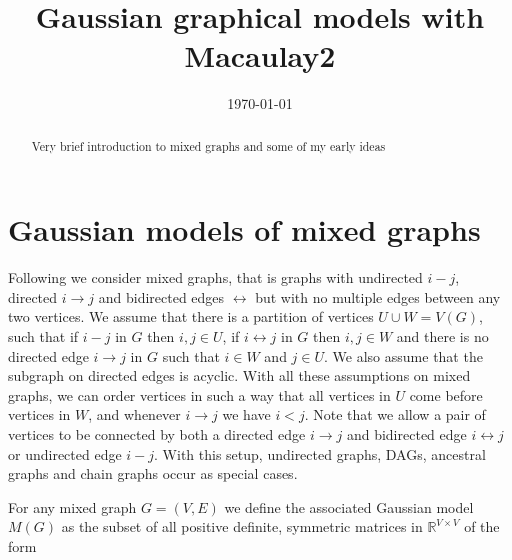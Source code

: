 \documentclass[11pt]{amsart}
\title{Gaussian graphical models with Macaulay2}
\author{}
\date{\today}                                            %
\theoremstyle{definition}
\theoremstyle{remark}
\newcommand{\R}{\mathbb{R}}
\newcommand{\lr}{\leftrightarrow}
\begin{document}
\maketitle
\begin{abstract}
Very brief introduction to mixed graphs and some of my early ideas
\end{abstract}


\section{Gaussian models of mixed graphs}

Following \cite{sullivant2008tsg} we consider mixed graphs, that is graphs with undirected $i-j$, directed $i\to j$ and bidirected edges $\lr$ but with no multiple edges between any two vertices. We assume that there is a partition of vertices $U\cup W=V(G)$, such that if $i-j$ in $G$ then $i,j\in U$, if $i\lr j$ in $G$ then $i,j\in W$ and there is no directed edge $i\to j$ in $G$ such that $i\in W$ and $j\in U$. We also assume that the subgraph on directed edges is acyclic. With all these assumptions on mixed graphs, we can order vertices in such a way that all vertices in $U$ come before vertices in $W$, and whenever $i\to j$ we have $i<j$. Note that we allow a pair of vertices to be connected by both a directed edge $i\to j$ and bidirected edge $i\lr j$ or undirected edge $i-j$. With this setup, undirected graphs, DAGs, ancestral graphs \cite{RSancestral2002} and chain graphs \cite{andersson2001} occur as special cases.

For any mixed graph $G=(V,E)$ we define the associated Gaussian model $M(G)$ as the subset of all positive definite, symmetric matrices in $\R^{V\times V}$ of the form
\end{document}
